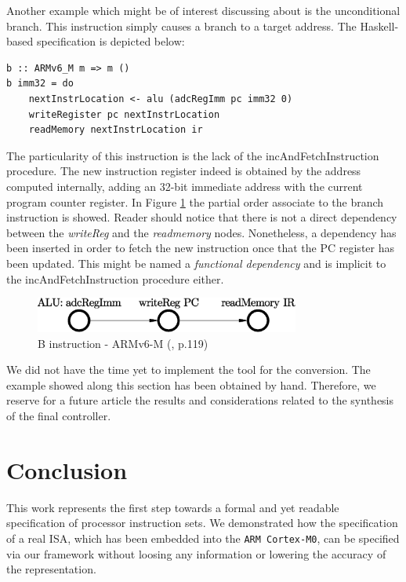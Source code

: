 \documentclass[conference]{IEEEtran}
\begin{document}
Another example which might be of interest discussing about is the unconditional branch. This
instruction simply causes a branch to a target address. The Haskell-based specification is
depicted below:\\

\begin{lstlisting}[caption=B instruction - Haskell-based specification,
frame=single, label=lis:and]
b :: ARMv6_M m => m ()
b imm32 = do
    nextInstrLocation <- alu (adcRegImm pc imm32 0)
    writeRegister pc nextInstrLocation
    readMemory nextInstrLocation ir
\end{lstlisting}

\noindent
The particularity of this instruction is the lack of the incAndFetchInstruction procedure.
The new instruction register indeed is obtained by the address computed internally, adding an
32-bit immediate address with the current program counter register. In Figure \ref{fig:bPO}
the partial order associate to the branch instruction is showed. Reader should notice that
there is not a direct dependency between the \textit{writeReg} and the \textit{readmemory}
nodes. Nonetheless, a dependency has been inserted in order to fetch the new instruction once
that the PC register has been updated. This might be named a \textit{functional dependency}
and is implicit to the incAndFetchInstruction procedure either.

\begin{figure}[ht!]
\begin{center}
	\includegraphics[width=8.7cm]{IMG/b.eps}
	\caption{B instruction - ARMv6-M (\cite{armManual}, p.119)}
	\label{fig:bPO}
\end{center}
\end{figure}

We did not have the time yet to implement the tool for the conversion.
The example showed along this section has been obtained by hand. Therefore, we reserve for a
future article the results and considerations related to the synthesis of the final
controller.


\section{Conclusion}
\label{sec:conclusion}
This work represents the first step towards a formal and yet readable specification of
processor instruction sets. We demonstrated how the specification of a real ISA, which has
been embedded into the \verb|ARM Cortex-M0|, can be specified via our framework without
loosing any information or lowering the accuracy of the representation.
\end{document}
